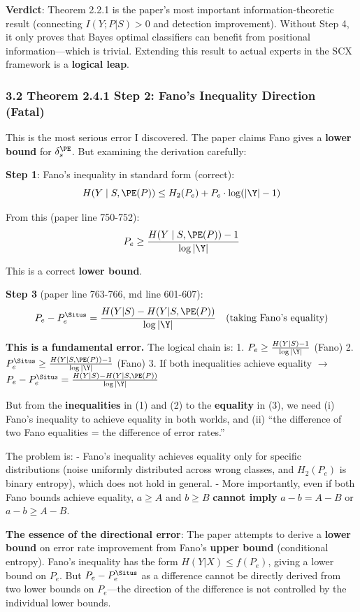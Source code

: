 \documentclass[
  12pt,
]{article}
\begin{document}
\textbf{Verdict}: Theorem 2.2.1 is the paper's most important information-theoretic result (connecting \(I(Y;P|S) > 0\) and detection improvement). Without Step 4, it only proves that Bayes optimal classifiers can benefit from positional information---which is trivial. Extending this result to actual experts in the SCX framework is a \textbf{logical leap}.

\subsubsection{3.2 Theorem 2.4.1 Step 2: Fano's Inequality Direction (Fatal)}\label{theorem-241-fano}

This is the most serious error I discovered. The paper claims Fano gives a \textbf{lower bound} for \(\delta_s^{\PE}\). But examining the derivation carefully:

\textbf{Step 1}: Fano's inequality in standard form (correct):
\[H(Y \mid S, \PE(P)) \leq H_2(P_e) + P_e \cdot \log(|\Y| - 1)\]

From this (paper line 750-752):
\[P_e \geq \frac{H(Y \mid S, \PE(P)) - 1}{\log |\Y|}\]

This is a correct \textbf{lower bound}.

\textbf{Step 3} (paper line 763-766, md line 601-607):
\[P_e - P_e^{\Situs} = \frac{H(Y|S) - H(Y|S, \PE(P))}{\log |\Y|} \quad (\text{taking Fano's equality})\]

\textbf{This is a fundamental error.} The logical chain is:
1. \(P_e \geq \frac{H(Y|S)-1}{\log|\Y|}\) (Fano)
2. \(P_e^{\Situs} \geq \frac{H(Y|S,\PE(P))-1}{\log|\Y|}\) (Fano)
3. If both inequalities achieve equality $\to$ \(P_e - P_e^{\Situs} = \frac{H(Y|S) - H(Y|S,\PE(P))}{\log|\Y|}\)

But from the \textbf{inequalities} in (1) and (2) to the \textbf{equality} in (3), we need (i) Fano's inequality to achieve equality in both worlds, and (ii) ``the difference of two Fano equalities = the difference of error rates.''

The problem is:
- Fano's inequality achieves equality only for specific distributions (noise uniformly distributed across wrong classes, and \(H_2(P_e)\) is binary entropy), which does not hold in general.
- More importantly, even if both Fano bounds achieve equality, \(a \geq A\) and \(b \geq B\) \textbf{cannot imply} \(a-b = A-B\) or \(a-b \geq A-B\).

\textbf{The essence of the directional error}: The paper attempts to derive a \textbf{lower bound} on error rate improvement from Fano's \textbf{upper bound} (conditional entropy). Fano's inequality has the form \(H(Y|X) \leq f(P_e)\), giving a lower bound on \(P_e\). But \(P_e - P_e^{\Situs}\) as a difference cannot be directly derived from two lower bounds on \(P_e\)---the direction of the difference is not controlled by the individual lower bounds.
\end{document}
